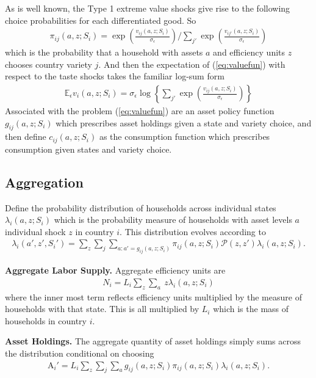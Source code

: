 \documentclass[12pt,pdftex]{article}
\begin{document}
\begin{onehalfspacing}
As is well known, the Type 1 extreme value shocks give rise to the following choice probabilities for each differentiated good. So
\begin{align}
\pi_{ij}(a, z; S_i) = \exp \left( \frac{ v_{ij}(a, z;  S_i ) }{\sigma_{\epsilon}} \right) \Bigg / \sum_{j'} \exp \left( \frac{ v_{ij'}(a, z;  S_i ) }{\sigma_{\epsilon}} \right) \label{eq:choice-prob}
\end{align}
which is the probability that a household with assets $a$ and efficiency units $z$ chooses country variety $j$. And then the expectation of (\ref{eq:valuefun}) with respect to the taste shocks takes the familiar log-sum form
\begin{align}
\mathbb{E}_{\epsilon} v_i(a, z; S_i) = \sigma_{\epsilon} \log \left\{ \sum_{j'} \exp \left( \frac{  v_{ij}(a, z;  S_i )}{\sigma_{\epsilon}} \right) \right\} \label{eq:log_sum}
\end{align}
Associated with the problem (\ref{eq:valuefun}) are an asset policy function $g_{ij}(a, z; S_i)$ which prescribes asset holdings given a state and variety choice, and then define $c_{ij}(a, z; S_i)$ as the consumption function which prescribes consumption given states and variety choice.

\subsection{Aggregation}

Define the probability distribution of households across individual states $\lambda_{i}(a, z; S_i )$ which is the probability measure of households with asset levels $a$ individual shock $z$ in country $i$. This distribution evolves according to
\begin{align}
\lambda_i(a', z', S_i') = \sum_{z}\sum_{j} \sum_{a: a' = g_{ij}(a, z; S_i)} \pi_{ij}(a, z; S_i) \mathcal{P}(z, z') \lambda_i(a, z; S_i).
\label{eq:law_motion}
\end{align}

\textbf{Aggregate Labor Supply.}  Aggregate efficiency units are
\begin{align}
N_i = L_{i}\sum_{z} \sum_{a}\ z \lambda_i(a, z; S_i) \label{eq:ag-labor-supply}
\end{align}
where the inner most term reflects efficiency units multiplied by the measure of households with that state. This is all multiplied by $L_i$ which is the mass of households in country $i$.

\textbf{Asset Holdings.} The aggregate quantity of asset holdings simply sums across the distribution conditional on choosing
\begin{align}
\mathrm{A}_i' = L_{i} \sum_{z}\sum_{j}\sum_{a}  g_{ij}(a, z; S_i) \pi_{ij}(a, z; S_i) \lambda_i(a, z; S_i).
\label{eq:aggregate_asset}
\end{align}


\end{onehalfspacing}
\end{document}
